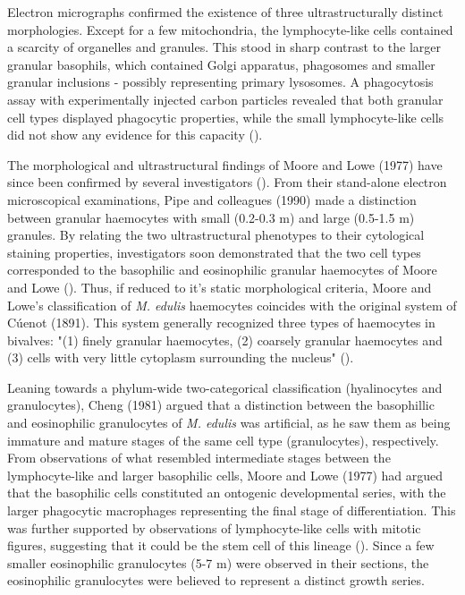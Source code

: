 Electron micrographs confirmed the existence of three ultrastructurally distinct morphologies. Except for a few mitochondria, the lymphocyte-like cells contained a scarcity of organelles and granules. This stood in sharp contrast to the larger granular basophils, which contained Golgi apparatus, phagosomes and smaller granular inclusions - possibly representing primary lysosomes. A phagocytosis assay with experimentally injected carbon particles revealed that both granular cell types displayed phagocytic properties, while the small lymphocyte-like cells did not show any evidence for this capacity (\cite{Moore1977}).

The morphological and ultrastructural findings of Moore and Lowe (1977) have since been confirmed by several investigators (\cite{Rasmussen1985, Renwartz1990, Pipe1990, Noel1994, Pipe1997, Wootton2003}). From their stand-alone electron microscopical examinations, Pipe and colleagues (1990) made a distinction between granular haemocytes with small (0.2-0.3 \micro m) and large (0.5-1.5 \micro m) granules. By relating the two ultrastructural phenotypes to their cytological staining properties, investigators soon demonstrated that the two cell types corresponded to the basophilic and eosinophilic granular haemocytes of Moore and Lowe (\cite{Pipe1990, Noel1994}). Thus, if reduced to it's static morphological criteria, Moore and Lowe's classification of \emph{M. edulis} haemocytes coincides with the original system of Cúenot (1891). This system generally recognized three types of haemocytes in bivalves: "(1) finely granular haemocytes, (2) coarsely granular haemocytes and (3) cells with very little cytoplasm surrounding the nucleus" (\cite{Cheng1984}). 

Leaning towards a phylum-wide two-categorical classification (hyalinocytes and granulocytes), Cheng (1981) argued that a distinction between the basophillic and eosinophilic granulocytes of \emph{M. edulis} was artificial, as he saw them as being immature and mature stages of the same cell type (granulocytes), respectively. From observations of what resembled intermediate stages between the lymphocyte-like and larger basophilic cells, Moore and Lowe (1977) had argued that the basophilic cells constituted an ontogenic developmental series, with the larger phagocytic macrophages representing the final stage of differentiation. This was further supported by observations of lymphocyte-like cells with mitotic figures, suggesting that it could be the stem cell of this lineage (\cite{Moore1977}). Since a few smaller eosinophilic granulocytes (5-7 \micro m) were observed in their sections, the eosinophilic granulocytes were believed to represent a distinct growth series.


